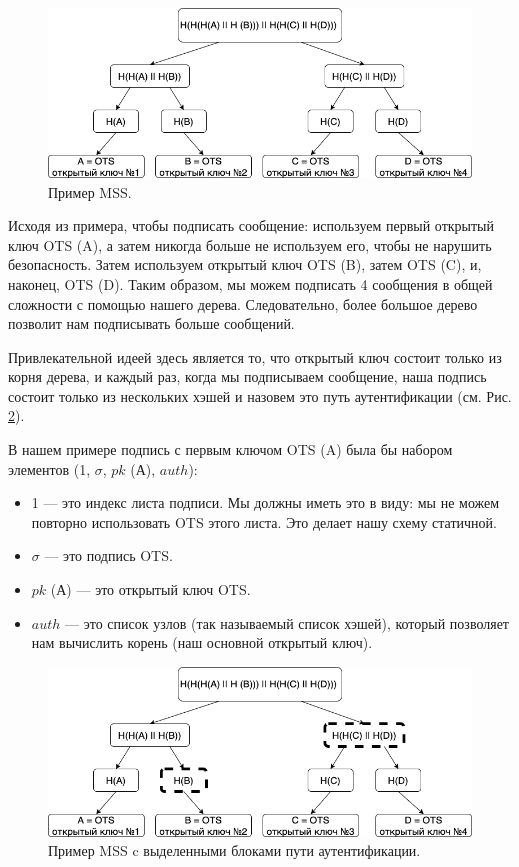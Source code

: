 \documentclass[a4paper, 14pt]{extarticle}
\begin{document}
\begin{figure}[h]
    \centering
    \includegraphics[scale=0.65]{MSS.png}
    \caption{Пример MSS.}
    \label{fig:MSS}
\end{figure}

Исходя из примера, чтобы подписать сообщение: используем первый открытый ключ OTS (A), а затем никогда больше не используем его, чтобы не нарушить безопасность. Затем используем открытый ключ OTS (B), затем OTS (C), и, наконец, OTS (D). Таким образом, мы можем подписать 4 сообщения в общей сложности с помощью нашего дерева. Следовательно, более большое дерево позволит нам подписывать больше сообщений.

Привлекательной идеей здесь является то, что открытый ключ состоит только из корня дерева, и каждый раз, когда мы подписываем сообщение, наша подпись состоит только из нескольких хэшей и назовем это путь аутентификации (см. Рис. \ref{fig:MSS_auth_path}).

В нашем примере подпись с первым ключом OTS (A) была бы набором элементов (1, $\sigma$, $pk$ (А), $auth$):

\begin{itemize}
    \item 1 --- это индекс листа подписи. Мы должны иметь это в виду: мы не можем повторно использовать OTS этого листа. Это делает нашу схему статичной.
    \item $\sigma$ --- это подпись OTS.
    \item $pk$ (А) --- это открытый ключ OTS.
    \item $auth$ --- это список узлов (так называемый список хэшей), который позволяет нам вычислить корень (наш основной открытый ключ).
\end{itemize}

\begin{figure}[h]
    \centering
    \includegraphics[scale=0.65]{MSS_auth_path.png}
    \caption{Пример MSS c выделенными блоками пути аутентификации.}
    \label{fig:MSS_auth_path}
\end{figure}
\end{document}
